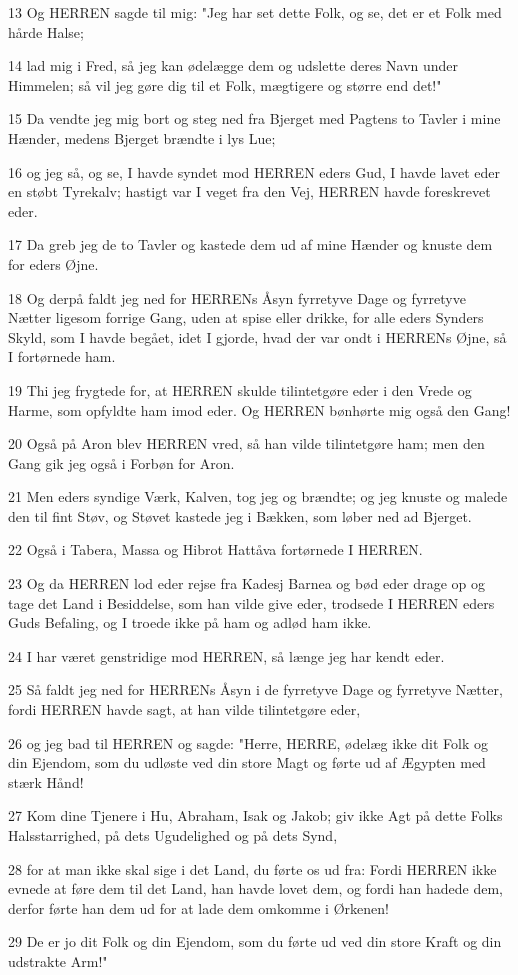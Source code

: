 \par 13 Og HERREN sagde til mig: "Jeg har set dette Folk, og se, det er et Folk med hårde Halse;
\par 14 lad mig i Fred, så jeg kan ødelægge dem og udslette deres Navn under Himmelen; så vil jeg gøre dig til et Folk, mægtigere og større end det!"
\par 15 Da vendte jeg mig bort og steg ned fra Bjerget med Pagtens to Tavler i mine Hænder, medens Bjerget brændte i lys Lue;
\par 16 og jeg så, og se, I havde syndet mod HERREN eders Gud, I havde lavet eder en støbt Tyrekalv; hastigt var I veget fra den Vej, HERREN havde foreskrevet eder.
\par 17 Da greb jeg de to Tavler og kastede dem ud af mine Hænder og knuste dem for eders Øjne.
\par 18 Og derpå faldt jeg ned for HERRENs Åsyn fyrretyve Dage og fyrretyve Nætter ligesom forrige Gang, uden at spise eller drikke, for alle eders Synders Skyld, som I havde begået, idet I gjorde, hvad der var ondt i HERRENs Øjne, så I fortørnede ham.
\par 19 Thi jeg frygtede for, at HERREN skulde tilintetgøre eder i den Vrede og Harme, som opfyldte ham imod eder. Og HERREN bønhørte mig også den Gang!
\par 20 Også på Aron blev HERREN vred, så han vilde tilintetgøre ham; men den Gang gik jeg også i Forbøn for Aron.
\par 21 Men eders syndige Værk, Kalven, tog jeg og brændte; og jeg knuste og malede den til fint Støv, og Støvet kastede jeg i Bækken, som løber ned ad Bjerget.
\par 22 Også i Tabera, Massa og Hibrot Hattåva fortørnede I HERREN.
\par 23 Og da HERREN lod eder rejse fra Kadesj Barnea og bød eder drage op og tage det Land i Besiddelse, som han vilde give eder, trodsede I HERREN eders Guds Befaling, og I troede ikke på ham og adlød ham ikke.
\par 24 I har været genstridige mod HERREN, så længe jeg har kendt eder.
\par 25 Så faldt jeg ned for HERRENs Åsyn i de fyrretyve Dage og fyrretyve Nætter, fordi HERREN havde sagt, at han vilde tilintetgøre eder,
\par 26 og jeg bad til HERREN og sagde: "Herre, HERRE, ødelæg ikke dit Folk og din Ejendom, som du udløste ved din store Magt og førte ud af Ægypten med stærk Hånd!
\par 27 Kom dine Tjenere i Hu, Abraham, Isak og Jakob; giv ikke Agt på dette Folks Halsstarrighed, på dets Ugudelighed og på dets Synd,
\par 28 for at man ikke skal sige i det Land, du førte os ud fra: Fordi HERREN ikke evnede at føre dem til det Land, han havde lovet dem, og fordi han hadede dem, derfor førte han dem ud for at lade dem omkomme i Ørkenen!
\par 29 De er jo dit Folk og din Ejendom, som du førte ud ved din store Kraft og din udstrakte Arm!"

